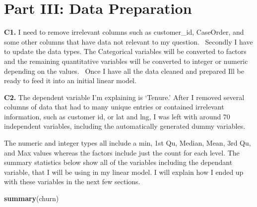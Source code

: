 \documentclass[
]{article}
\newenvironment{Shaded}{\begin{snugshade}}{\end{snugshade}}
\newcommand{\FunctionTok}[1]{\textcolor[rgb]{0.13,0.29,0.53}{\textbf{#1}}}
\newcommand{\NormalTok}[1]{#1}
\begin{document}
\section{Part III: Data Preparation}\label{part-iii-data-preparation}

\textbf{C1.} I need to remove irrelevant columns such as customer\_id,
CaseOrder, and some other columns that have data not relevant to my
question.~ Secondly I have to update the data types. The Categorical
variables will be converted to factors and the remaining quantitative
variables will be converted to integer or numeric depending on the
values.~ Once I have all the data cleaned and prepared Ill be ready to
feed it into an initial linear model.~

\textbf{C2.} The dependent variable I'm explaining is `Tenure.' After I
removed several columns of data that had to many unique entries or
contained irrelevant information, such as customer id, or lat and lng, I
was left with around 70 independent variables, including the
automatically generated dummy variables.~

The numeric and integer types all include a min, 1st Qu, Median, Mean,
3rd Qu, and Max values whereas the factors include just the count for
each level. The summary statistics below show all of the variables
including the dependant variable, that I will be using in my linear
model. I will explain how I ended up with these variables in the next
few sections.

\begin{Shaded}
\begin{Highlighting}[]
\FunctionTok{summary}\NormalTok{(churn)}
\end{Highlighting}
\end{Shaded}
\end{document}
